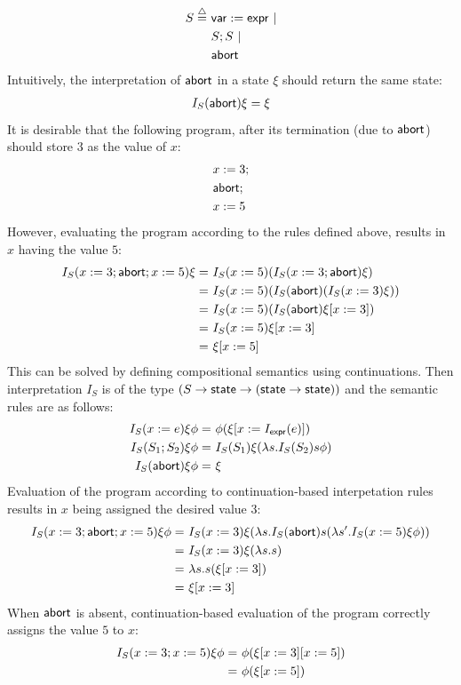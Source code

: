 \begin{example}
\begin{align}
S  \stackrel{{\scriptstyle\triangle}}{=} \ & \mathsf{var} := \mathsf{expr} \ | \notag \\
& S;S \ | \notag \\
& \mathsf{abort} \notag
\end{align}
Intuitively, the interpretation of $\mathsf{abort}$ in a state $\xi$ should return the same state:
\begin{align}
I_{S}(\mathsf{abort})\xi = \xi \notag
\end{align}
It is desirable that the following program, after its termination (due to $\mathsf{abort}$) should store $3$ as the value of $x$:
\begin{align*}
& x:= 3; \notag \\
& \mathsf{abort}; \notag \\
& x:= 5 \notag
\end{align*}
However, evaluating the program according to the rules defined above, 
results in $x$ having the value $5$:
\begin{align}
I_S(x:=3;\mathsf{abort}; x:=5)\xi  = \ & I_S(x:=5)(I_S(x:=3; \mathsf{abort})\xi ) \notag \\
= \ & I_S(x:=5)(I_S(\mathsf{abort})(I_S(x:=3) \xi)) \notag \\
= \ & I_S(x:=5)(I_S(\mathsf{abort}) \xi [ x:=3 ] )  \notag \\
= \ & I_S(x:=5) \xi [  x:=3 ] \notag \\
= \ & \xi [ x:=5] \notag
\end{align}
This can be solved by defining compositional semantics using continuations. Then interpretation $I_S$ is of the type $(S \rightarrow \mathsf{state} \rightarrow (\mathsf{state} \rightarrow \mathsf{state}))$ and the semantic rules are as follows:
\begin{align}
I_{S}(x:=e) \xi \phi = \ & \phi(\xi [ x:=I_{\mathsf{expr}}(e)]) \notag \\
I_{S}(S_1;S_2)\xi \phi = \ &  I_S(S_1)\xi(\lambda s.I_{S}(S_2)s \phi) \notag \\
I_{S}(\mathsf{abort}) \xi \phi = \ &\xi \notag
\end{align}
Evaluation of the program according to continuation-based interpetation rules results in $x$ being assigned the desired value $3$:
\begin{align}
I_{S}(x:=3; \mathsf{abort}; x:=5) \xi \phi  = \ & I_{S}(x:=3) \xi ( \lambda s. I_{S}(\mathsf{abort}) s ( \lambda s'. I_{S}(x:=5) \xi \phi )) \notag \\
= \ & I_{S}(x:=3) \xi (\lambda s.s) \notag \\
= \ & \lambda s.s (\xi [x:=3] )  \notag \\
= \ & \xi [x:=3] \notag
\end{align}
When $\mathsf{abort}$ is absent, continuation-based evaluation of the program  correctly assigns the value $5$ to $x$:
\begin{align}
I_{S}(x:=3; x:=5) \xi \phi = \ & \phi(\xi[x:=3][x:=5]) \notag \\
= \ & \phi (\xi [x:=5]) \notag
\end{align} \qex
\end{example}


